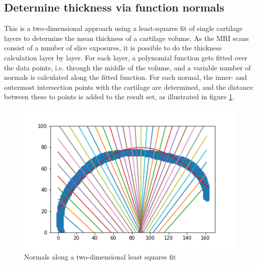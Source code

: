 \subsection{Determine thickness via function normals}
\label{sec:Normals}
This is a two-dimensional approach using a least-squares fit of single cartilage layers to determine the mean thickness of a cartilage volume. As the MRI scans consist of a number of slice exposures, it is possible to do the thickness calculation layer by layer. For each layer, a polynomial function gets fitted over the data points, i.e. through the middle of the volume, and a variable number of normals is calculated along the fitted function. For each normal, the inner- and outermost intersection points with the cartilage are determined, and the distance between these to points is added to the result set, as illustrated in figure \ref{fig:normals}.
\begin{figure}[htb!]
	\centering
	\includegraphics[width=\linewidth]{./figures/normals}
	\caption{Normals along a two-dimensional least squares fit}
	\label{fig:normals}
\end{figure} 

